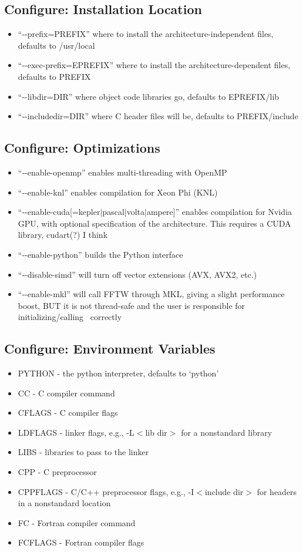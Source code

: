 \documentclass[10pt,letterpaper]{article}
\begin{document}
\subsection{Configure: Installation Location}
 \begin{itemize}
  \item ``-{}-prefix=PREFIX'' where to install the architecture-independent
        files, defaults to /usr/local
  \item ``-{}-exec-prefix=EPREFIX'' where to install the architecture-dependent
        files, defaults to PREFIX
  \item ``-{}-libdir=DIR'' where object code libraries go, defaults to EPREFIX/lib
  \item ``-{}-includedir=DIR'' where C header files will be, defaults to PREFIX/include
 \end{itemize}
\subsection{Configure: Optimizations}
 \begin{itemize}
  \item ``-{}-enable-openmp'' enables multi-threading with OpenMP
  \item ``-{}-enable-knl'' enables compilation for Xeon Phi (KNL)
  \item ``-{}-enable-cuda[=kepler$|$pascal$|$volta$|$ampere]'' enables compilation for
        Nvidia GPU, with optional specification of the architecture. This requires
        a CUDA library, cudart(?) I think
  \item ``-{}-enable-python'' builds the Python interface
  \item ``-{}-disable-simd'' will turn off vector extensions (AVX, AVX2, etc.)
  \item ``-{}-enable-mkl'' will call FFTW through MKL, giving a slight performance boost,
        BUT it is not thread-safe and the user is responsible for initializing/calling
        \shtns\ correctly
 \end{itemize}
\subsection{Configure: Environment Variables}
 \begin{itemize}
  \item PYTHON - the python interpreter, defaults to `python'
  \item CC - C compiler command
  \item CFLAGS - C compiler flags
  \item LDFLAGS - linker flags, e.g., -L$<$lib dir$>$ for a nonstandard library
  \item LIBS - libraries to pass to the linker
  \item CPP - C preprocessor
  \item CPPFLAGS - C/C++ preprocessor flags, e.g., -I$<$include dir$>$ for headers in
        a nonstandard location
  \item FC - Fortran compiler command
  \item FCFLAGS - Fortran compiler flags
 \end{itemize}
\end{document}
